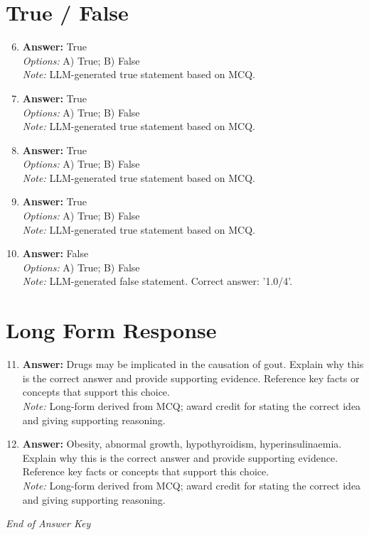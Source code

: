 \documentclass[12pt]{article}
\begin{document}
\section*{True / False}
\begin{enumerate}[label=\arabic*.]
\setcounter{enumi}{5}
\item \textbf{Answer:} True
\\ \textit{Options:} A) True; B) False
\\ \textit{Note:} LLM-generated true statement based on MCQ.
\item \textbf{Answer:} True
\\ \textit{Options:} A) True; B) False
\\ \textit{Note:} LLM-generated true statement based on MCQ.
\item \textbf{Answer:} True
\\ \textit{Options:} A) True; B) False
\\ \textit{Note:} LLM-generated true statement based on MCQ.
\item \textbf{Answer:} True
\\ \textit{Options:} A) True; B) False
\\ \textit{Note:} LLM-generated true statement based on MCQ.
\item \textbf{Answer:} False
\\ \textit{Options:} A) True; B) False
\\ \textit{Note:} LLM-generated false statement. Correct answer: '1.0/4'.
\end{enumerate}

\section*{Long Form Response}
\begin{enumerate}[label=\arabic*.]
\setcounter{enumi}{10}
\item \textbf{Answer:} Drugs may be implicated in the causation of gout. Explain why this is the correct answer and provide supporting evidence. Reference key facts or concepts that support this choice.
\\ \textit{Note:} Long-form derived from MCQ; award credit for stating the correct idea and giving supporting reasoning.
\item \textbf{Answer:} Obesity, abnormal growth, hypothyroidism, hyperinsulinaemia. Explain why this is the correct answer and provide supporting evidence. Reference key facts or concepts that support this choice.
\\ \textit{Note:} Long-form derived from MCQ; award credit for stating the correct idea and giving supporting reasoning.
\end{enumerate}

\vfill
\noindent\textit{End of Answer Key}
\end{document}
